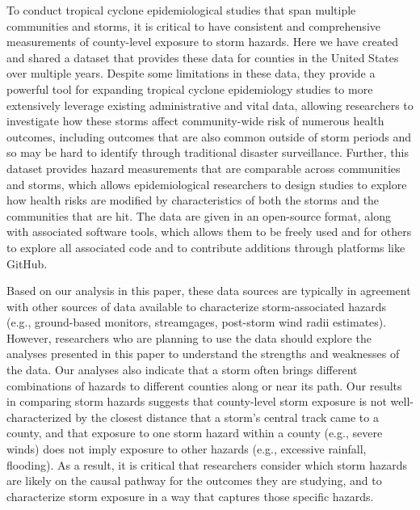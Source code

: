 To conduct tropical cyclone epidemiological studies that span multiple
communities and storms, it is critical to have consistent and comprehensive
measurements of county-level exposure to storm hazards. Here we have created
and shared a dataset that provides these data for counties in the United States
over multiple years. Despite some limitations in these data, they provide a
powerful tool for expanding tropical cyclone epidemiology studies to more
extensively leverage existing administrative and vital data, allowing
researchers to investigate how these storms affect community-wide risk of
numerous health outcomes, including outcomes that are also common outside of
storm periods and so may be hard to identify through traditional disaster
surveillance.  Further, this dataset provides hazard measurements that are
comparable across communities and storms, which allows epidemiological
researchers to design studies to explore how health risks are modified by
characteristics of both the storms and the communities that are hit. The data
are given in an open-source format, along with associated software tools, which
allows them to be freely used and for others to explore all associated code and
to contribute additions through platforms like GitHub.

Based on our analysis in this paper, these data sources are typically in agreement
with other sources of data available to characterize storm-associated hazards
(e.g., ground-based monitors, streamgages, post-storm wind radii estimates). 
However, researchers who are planning to use the data should explore the analyses
presented in this paper to understand the strengths and weaknesses of the data. 
Our analyses also indicate that a storm often brings different combinations of 
hazards to different counties along or near its path. Our results in comparing 
storm hazards suggests that county-level storm exposure is not well-characterized 
by the closest distance that a storm's central track came to a county, and that
exposure to one storm hazard within a county (e.g., severe winds) does not imply 
exposure to other hazards (e.g., excessive rainfall, flooding). As a result, it is 
critical that researchers consider which storm hazards are likely on the causal 
pathway for the outcomes they are studying, and to characterize storm exposure
in a way that captures those specific hazards. 
